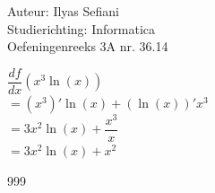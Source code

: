 \documentclass[a4paper]{article}
\begin{document}
\noindent \large Auteur: Ilyas Sefiani \\
\noindent \large Studierichting: Informatica\\
\noindent \large Oefeningenreeks 3A nr. 36.14\\

\medskip

\normalsize

$\dfrac{df}{dx}(x^3\ln(x))$\\

$= (x^3)'\ln(x)+(\ln(x))'x^3$\\

$= 3x^2\ln(x)+\dfrac{x^3}{x}$\\  

$= 3x^2\ln(x)+x^2$\\

\begin{thebibliography}{999}
\end{thebibliography}
\end{document}
